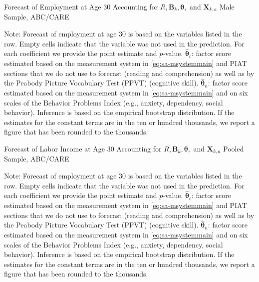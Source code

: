 \begin{table}
\begin{threeparttable}
\caption{Forecast of Employment at Age 30 Accounting for $R, \bm{B}_k, \bm{\theta},$ and $\bm{X}_{k,a}$ Male Sample, ABC/CARE}
\label{table:end2}
\centering
\scriptsize

\begin{tablenotes}
\footnotesize
\item Note: Forecast of employment at age 30 is based on the variables listed in the row. Empty cells indicate that the variable was not used in the prediction. For each coefficient we provide the point estimate and $p$-value. $\hat{\bm{\theta}}_{c}$: factor score estimated based on the measurement system in \eqref{eq:sa-msystemmain} and PIAT sections that we do not use to forecast (reading and comprehension) as well as by the Peabody Picture Vocabulary Test (PPVT) (cognitive skill). $\hat{\bm{\theta}}_{n}$: factor score estimated based on the measurement system in \eqref{eq:sa-msystemmain} and on six scales of the Behavior Problems Index (e.g., anxiety, dependency, social behavior). Inference is based on the empirical bootstrap distribution. If the estimates for the constant terms are in the ten or hundred thousands, we report a figure that has been rounded to the thousands.
\end{tablenotes}
\end{threeparttable}
\end{table}

\begin{table}
\begin{threeparttable}
\caption{Forecast of Labor Income at Age 30 Accounting for $R, \bm{B}_k, \bm{\theta},$ and $\bm{X}_{k,a}$ Pooled Sample, ABC/CARE}
\label{table:end2}
\centering
\scriptsize

\begin{tablenotes}
\footnotesize
\item Note: Forecast of employment at age 30 is based on the variables listed in the row. Empty cells indicate that the variable was not used in the prediction. For each coefficient we provide the point estimate and $p$-value. $\hat{\bm{\theta}}_{c}$: factor score estimated based on the measurement system in \eqref{eq:sa-msystemmain} and PIAT sections that we do not use to forecast (reading and comprehension) as well as by the Peabody Picture Vocabulary Test (PPVT) (cognitive skill). $\hat{\bm{\theta}}_{n}$: factor score estimated based on the measurement system in \eqref{eq:sa-msystemmain} and on six scales of the Behavior Problems Index (e.g., anxiety, dependency, social behavior). Inference is based on the empirical bootstrap distribution. If the estimates for the constant terms are in the ten or hundred thousands, we report a figure that has been rounded to the thousands.
\end{tablenotes}
\end{threeparttable}
\end{table}

